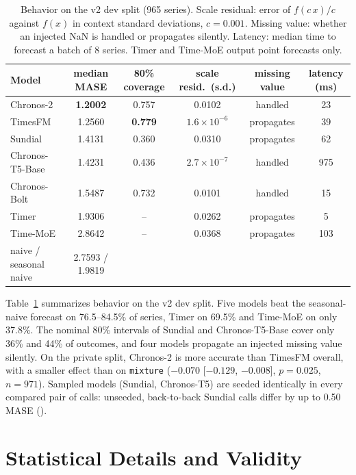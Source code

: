 \begin{table}[!tb]
\centering
\footnotesize
\setlength{\tabcolsep}{4pt}
\begin{tabular}{@{}lccccc@{}}
\toprule
Model & median MASE & 80\% coverage & scale resid.\ (s.d.) & missing value & latency (ms) \\
\midrule
\textcolor{ctwo}{Chronos-2}    & \textbf{1.2002} & 0.757 & 0.0102 & handled & 23 \\
\textcolor{tfm}{TimesFM}       & 1.2560 & \textbf{0.779} & $1.6\times10^{-6}$ & propagates & 39 \\
\textcolor{sun}{Sundial}       & 1.4131 & 0.360 & 0.0310 & propagates & 62 \\
\textcolor{tt5}{Chronos-T5-Base} & 1.4231 & 0.436 & $2.7\times10^{-7}$ & handled & 975 \\
\textcolor{bolt}{Chronos-Bolt} & 1.5487 & 0.732 & 0.0101 & handled & 15 \\
\textcolor{timer}{Timer}       & 1.9306 & -- & 0.0262 & propagates & 5 \\
\textcolor{tmoe}{Time-MoE}     & 2.8642 & -- & 0.0368 & propagates & 103 \\
\midrule
naive / seasonal naive & 2.7593 / 1.9819 & & & & \\
\bottomrule
\end{tabular}
\caption{Behavior on the v2 dev split (965 series). Scale residual: error of $f(c\,x)/c$ against $f(x)$ in context
standard deviations, $c=0.001$. Missing value: whether an injected NaN is handled or propagates silently. Latency: median
time to forecast a batch of 8 series. Timer and Time-MoE output point forecasts only.}
\label{tab:character}
\end{table}

Table~\ref{tab:character} summarizes behavior on the v2 dev split. Five models beat the seasonal-naive forecast on
76.5--84.5\% of series, Timer on 69.5\% and Time-MoE on only 37.8\%. The nominal 80\% intervals of Sundial and
Chronos-T5-Base cover only 36\% and 44\% of outcomes, and four models propagate an injected missing value silently. On
the private split, Chronos-2 is more accurate than TimesFM overall, with a smaller effect than on \texttt{mixture}
($-0.070$ [$-0.129$, $-0.008$], $p=0.025$, $n=971$). Sampled models (Sundial, Chronos-T5) are seeded identically in every
compared pair of calls: unseeded, back-to-back Sundial calls differ by up to 0.50 MASE ().

\section{Statistical Details and Validity}
\label{app:stats}


